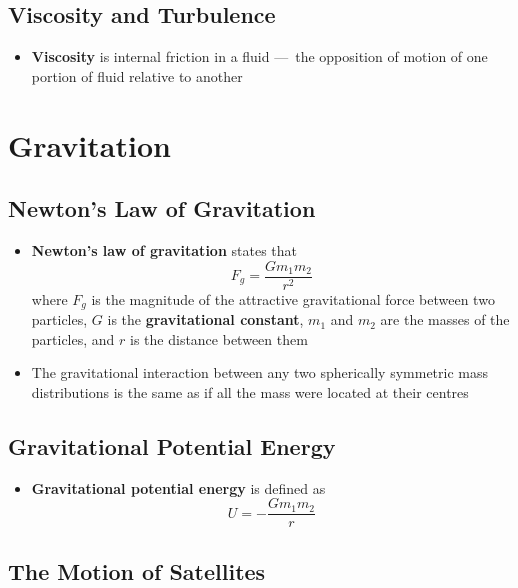 \documentclass{article}
\begin{document}
\subsection{Viscosity and Turbulence}

\begin{itemize}
    \item \textbf{Viscosity} is internal friction in a fluid — the opposition of motion of one portion of fluid relative to another
\end{itemize}

\section{Gravitation}

\subsection{Newton's Law of Gravitation}

\begin{itemize}
    \item \textbf{Newton's law of gravitation} states that \[F_g=\frac{Gm_1m_2}{r^2}\] where $F_g$ is the magnitude of the attractive gravitational force between two particles, $G$ is the \textbf{gravitational constant}, $m_1$ and $m_2$ are the masses of the particles, and $r$ is the distance between them

    \item The gravitational interaction between any two spherically symmetric mass distributions is the same as if all the mass were located at their centres
\end{itemize}

\subsection{Gravitational Potential Energy}

\begin{itemize}
    \item \textbf{Gravitational potential energy} is defined as \[U=-\frac{Gm_1m_2}{r}\]
\end{itemize}

\setcounter{subsection}{3}
\subsection{The Motion of Satellites}
\end{document}
